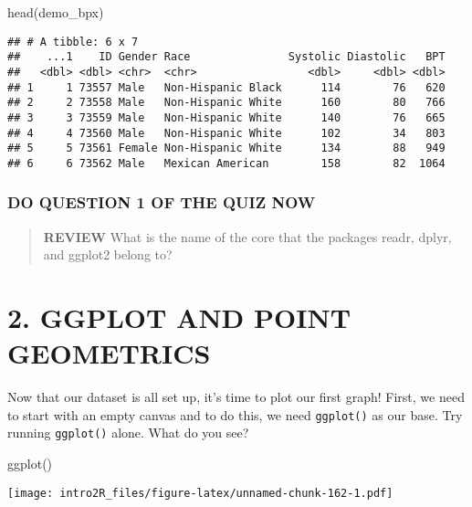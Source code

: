 \documentclass[
]{book}
\newenvironment{Shaded}{\begin{snugshade}}{\end{snugshade}}
\newcommand{\FunctionTok}[1]{\textcolor[rgb]{0.00,0.00,0.00}{#1}}
\newcommand{\NormalTok}[1]{#1}
\begin{document}
\begin{Shaded}
\begin{Highlighting}[]
\FunctionTok{head}\NormalTok{(demo\_bpx)}
\end{Highlighting}
\end{Shaded}

\begin{verbatim}
## # A tibble: 6 x 7
##    ...1    ID Gender Race               Systolic Diastolic   BPT
##   <dbl> <dbl> <chr>  <chr>                 <dbl>     <dbl> <dbl>
## 1     1 73557 Male   Non-Hispanic Black      114        76   620
## 2     2 73558 Male   Non-Hispanic White      160        80   766
## 3     3 73559 Male   Non-Hispanic White      140        76   665
## 4     4 73560 Male   Non-Hispanic White      102        34   803
## 5     5 73561 Female Non-Hispanic White      134        88   949
## 6     6 73562 Male   Mexican American        158        82  1064
\end{verbatim}

\hypertarget{do-question-1-of-the-quiz-now-1}{%
\subsubsection{DO QUESTION 1 OF THE QUIZ NOW}\label{do-question-1-of-the-quiz-now-1}}

\begin{quote}
\textbf{REVIEW} What is the name of the core that the packages readr, dplyr, and ggplot2 belong to?
\end{quote}

\hypertarget{ggplot-and-point-geometrics}{%
\section{2. GGPLOT AND POINT GEOMETRICS}\label{ggplot-and-point-geometrics}}

Now that our dataset is all set up, it's time to plot our first graph! First, we need to start with an empty canvas and to do this, we need \texttt{ggplot()} as our base. Try running \texttt{ggplot()} alone. What do you see?

\begin{Shaded}
\begin{Highlighting}[]
\FunctionTok{ggplot}\NormalTok{()}
\end{Highlighting}
\end{Shaded}

\texttt{[image: intro2R\_files/figure-latex/unnamed-chunk-162-1.pdf]}
\end{document}
